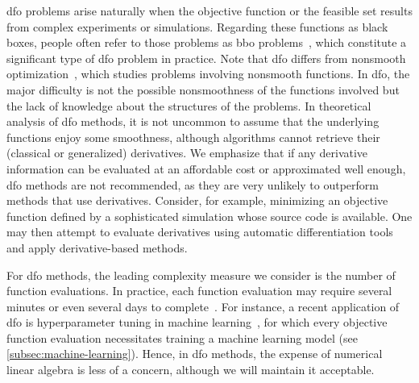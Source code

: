 \Gls{dfo} problems arise naturally when the objective function or the feasible set results from complex experiments or simulations.
Regarding these functions as black boxes, people often refer to those problems as \gls{bbo} problems~\cite{Audet_Hare_2017}, which constitute a significant type of \gls{dfo} problem in practice.
Note that \gls{dfo} differs from nonsmooth optimization~\cite{Clark_1983,Cui_Pang_2021}, which studies problems involving nonsmooth functions.
In \gls{dfo}, the major difficulty is not the possible nonsmoothness of the functions involved but the lack of knowledge about the structures of the problems.
In theoretical analysis of \gls{dfo} methods, it is not uncommon to assume that the underlying functions enjoy some smoothness, although algorithms cannot retrieve their (classical or generalized) derivatives.
We emphasize that if any derivative information can be evaluated at an affordable cost or approximated well enough, \gls{dfo} methods are not recommended, as they are very unlikely to outperform methods that use derivatives.
Consider, for example, minimizing an objective function defined by a sophisticated simulation whose source code is available.
One may then attempt to evaluate derivatives using automatic differentiation tools~\cite{Griewank_2003,Griewank_Walther_2008} and apply derivative-based methods.

For \gls{dfo} methods, the leading complexity measure we consider is the number of function evaluations.
In practice, each function evaluation may require several minutes or even several days to complete~\cite[\S~1.4]{Audet_Hare_2017}.
For instance, a recent application of \gls{dfo} is hyperparameter tuning in machine learning~\cite{Ghanbari_Scheinberg_2017}, for which every objective function evaluation necessitates training a machine learning model (see \cref{subsec:machine-learning}).
Hence, in \gls{dfo} methods, the expense of numerical linear algebra is less of a concern, although we will maintain it acceptable.

